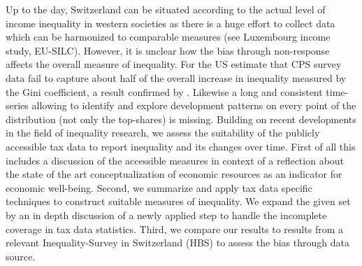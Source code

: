 \documentclass[twoside]{article}\usepackage[]{graphicx}\usepackage[]{color}
\begin{document}
\begin{multicols}{2}

Up to the day, Switzerland can be situated according to the actual level of income inequality in western societies as there is a huge effort to collect data which can be harmonized to comparable measures (see Luxembourg income study, EU-SILC). However, it is unclear how the bias through non-response affects the overall measure of inequality. For the US \citet{atkinson_top_2009} estimate that CPS survey data fail to capture about half of the overall increase in inequality measured by the Gini coefficient, a result confirmed by \citet{Alvaredo (2010) FEHLT}. Likewise a long and consistent time-series allowing to identify and explore development patterns on every point of the distribution (not only the top-shares) is missing. Building on recent developments in the field of inequality research, we assess the suitability of the publicly accessible tax data to report inequality and its changes over time. First of all this includes a discussion of the accessible measures in context of a reflection about the state of the art conceptualization of economic resources as an indicator for economic well-being. Second, we summarize and apply tax data specific techniques to construct suitable measures of inequality. We expand the given set by an in depth discussion of a newly applied step to handle the incomplete coverage in tax data statistics. Third, we compare our results to results from a relevant Inequality-Survey in Switzerland (HBS) to assess the bias through data source.








\end{multicols}
\end{document}
